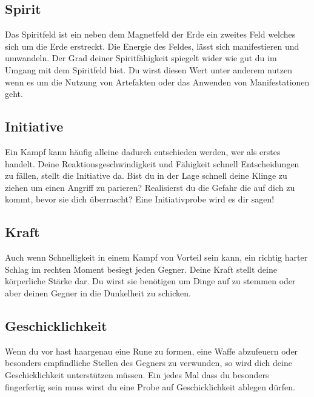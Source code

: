         
        \subsection*{Spirit}
            Das Spiritfeld ist ein neben dem Magnetfeld der Erde ein zweites Feld welches sich um die Erde erstreckt. Die Energie des Feldes, lässt sich manifestieren und umwandeln. Der Grad deiner Spiritfähigkeit spiegelt wider wie gut du im Umgang mit dem Spiritfeld bist. Du wirst diesen Wert unter anderem nutzen wenn es um die Nutzung von Artefakten oder das Anwenden von Manifestationen geht.

        
        \subsection*{Initiative}
            Ein Kampf kann häufig alleine dadurch entschieden werden, wer als erstes handelt. Deine Reaktionsgeschwindigkeit und Fähigkeit schnell Entscheidungen zu fällen, stellt die Initiative da. Bist du in der Lage schnell deine Klinge zu ziehen um einen Angriff zu parieren? Realisierst du die Gefahr die auf dich zu kommt, bevor sie dich überrascht? Eine Initiativprobe wird es dir sagen!

        
        \subsection*{Kraft}
            Auch wenn Schnelligkeit in einem Kampf von Vorteil sein kann, ein richtig harter Schlag im rechten Moment besiegt jeden Gegner. Deine Kraft stellt deine körperliche Stärke dar. Du wirst sie benötigen um Dinge auf zu stemmen oder aber deinen Gegner in die Dunkelheit zu schicken. 

        
        \subsection*{Geschicklichkeit}
            Wenn du vor hast haargenau eine Rune zu formen, eine Waffe abzufeuern oder besonders empfindliche Stellen des Gegners zu verwunden, so wird dich deine Geschicklichkeit unterstützen müssen. Ein jedes Mal dass du besonders fingerfertig sein muss wirst du eine Probe auf Geschicklichkeit ablegen dürfen.

    

